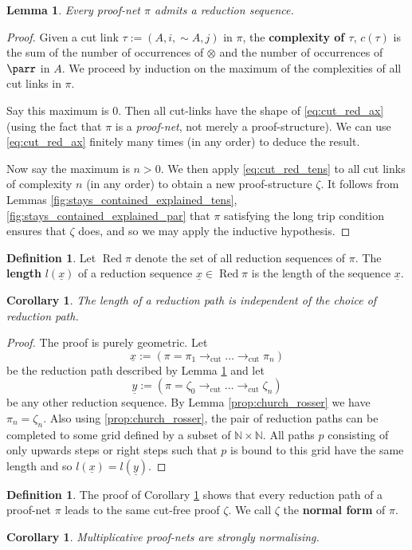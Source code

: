 \documentclass[12pt]{article}
\theoremstyle{plain}
\newtheorem{lemma}[thm]{Lemma}
\newtheorem{cor}[thm]{Corollary}
\theoremstyle{definition}
\newtheorem{defn}[thm]{Definition} %
\newcommand{\bb}[1]{\mathbb{#1}}
\newcommand{\lto}{\longrightarrow}
\newcommand{\negation}{\sim}
\begin{document}
\begin{lemma}\label{lem:red_sequence_existence}
Every proof-net $\pi$ admits a reduction sequence.
\end{lemma}
\begin{proof}
Given a cut link $\tau := (A,i,\negation A, j)$ in $\pi$, the \textbf{complexity of $\tau$}, $c(\tau)$ is the sum of the number of occurrences of $\otimes$ and the number of occurrences of $\parr$ in $A$. We proceed by induction on the maximum of the complexities of all cut links in $\pi$.

Say this maximum is $0$. Then all cut-links have the shape of \eqref{eq:cut_red_ax} (using the fact that $\pi$ is a \emph{proof-net}, not merely a proof-structure). We can use \eqref{eq:cut_red_ax} finitely many times (in any order) to deduce the result.

Now say the maximum is $n > 0$. We then apply \eqref{eq:cut_red_tens} to all cut links of complexity $n$ (in any order) to obtain a new proof-structure $\zeta$. It follows from Lemmas \ref{fig:stays_contained_explained_tens}, \ref{fig:stays_contained_explained_par} that $\pi$ satisfying the long trip condition ensures that $\zeta$ does, and so we may apply the inductive hypothesis.
\end{proof}
\begin{defn}
Let $\operatorname{Red}\pi$ denote the set of all reduction sequences of $\pi$. The \textbf{length} $l(\underline{x})$ of a reduction sequence $\underline{x} \in \operatorname{Red}\pi$ is the length of the sequence $\underline{x}$.
\end{defn}
\begin{cor}\label{cor:stable_length}
The length of a reduction path is independent of the choice of reduction path.
\end{cor}
\begin{proof}
The proof is purely geometric. Let
\begin{equation}
    \underline{x} := ( \pi = \pi_1 \lto_{\operatorname{cut}} \hdots \lto_{\operatorname{cut}} \pi_n)
\end{equation}
be the reduction path described by Lemma \ref{lem:red_sequence_existence} and let
\begin{equation}
    \underline{y} := (\pi = \zeta_0 \lto_{\operatorname{cut}} \hdots \lto_{\operatorname{cut}} \zeta_n)
\end{equation}
be any other reduction sequence. By Lemma \ref{prop:church_rosser} we have $\pi_n = \zeta_n$. Also using \ref{prop:church_rosser}, the pair of reduction paths can be completed to some grid defined by a subset of $\bb{N} \times \bb{N}$. All paths $p$ consisting of only upwards steps or right steps such that $p$ is bound to this grid have the same length and so $l(\underline{x}) = l(\underline{y})$.
\end{proof}
\begin{defn}\label{def:normal_form}
The proof of Corollary \ref{cor:stable_length} shows that every reduction path of a proof-net $\pi$ leads to the same cut-free proof $\zeta$. We call $\zeta$ the \textbf{normal form} of $\pi$.
\end{defn}
\begin{cor}
Multiplicative proof-nets are strongly normalising.
\end{cor}
\end{document}
